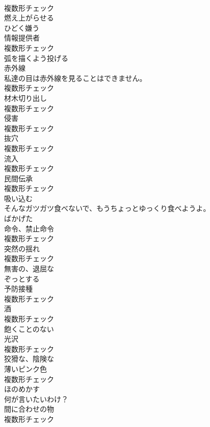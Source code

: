 \documentclass[8pt]{extreport}
\begin{document}
\begin{CJK}{UTF8}{min}
\\	複数形チェック
\\	[動詞]	燃え上がらせる	
\\	[動詞]	ひどく嫌う	
\\	[名詞]	情報提供者	
\\	複数形チェック
\\	[動詞]	弧を描くよう投げる	
\\	[名詞]	赤外線	
\\	私達の目は赤外線を見ることはできません。	
\\	複数形チェック
\\	[名詞]	材木切り出し	
\\	複数形チェック
\\	[名詞]	侵害	
\\	複数形チェック
\\	[名詞]	抜穴	
\\	複数形チェック
\\	[名詞]	流入	
\\	複数形チェック
\\	[名詞]	⺠間伝承	
\\	複数形チェック
\\	[動詞]	吸い込む	
\\	そんなガツガツ食べないで、もうちょっとゆっくり食べようよ。	
\\	[形容詞]	ばかげた	
\\	[名詞]	命令、禁止命令	
\\	複数形チェック
\\	[名詞]	突然の揺れ	
\\	複数形チェック
\\	[形容詞]	無害の、退屈な	
\\	[形容詞]	ぞっとする	
\\	[名詞]	予防接種	
\\	複数形チェック
\\	[名詞]	酒	
\\	複数形チェック
\\	[形容詞]	飽くことのない	
\\	[名詞]	光沢	
\\	複数形チェック
\\	[形容詞]	狡猾な、陰険な	
\\	[名詞]	薄いピンク色	
\\	複数形チェック
\\	[動詞]	ほのめかす	
\\	何が言いたいわけ？	
\\	[名詞]	間に合わせの物	
\\	複数形チェック

\end{CJK}
\end{document}
